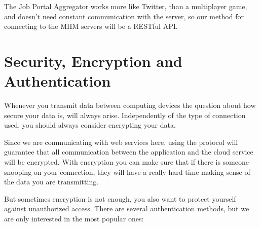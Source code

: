 The Job Portal Aggregator works more like Twitter, than a multiplayer game, and doesn't need constant communication with the server, so our method for connecting to the MHM servers will be a RESTful \ac{API}.
\newpage
\section{Security, Encryption and Authentication}
Whenever you transmit data between computing devices the question about how secure your data is, will always arise. Independently of the type of connection used, you should always consider encrypting your data.

Since we are communicating with web services here, using the  protocol will guarantee that all communication between the application and the cloud service will be encrypted. With encryption you can make sure that if there is someone snooping on your connection, they will have a really hard time making sense of the data you are transmitting.

But sometimes encryption is not enough, you also want to protect yourself against unauthorized access. There are several authentication methods, but we are only interested in the most popular ones:

